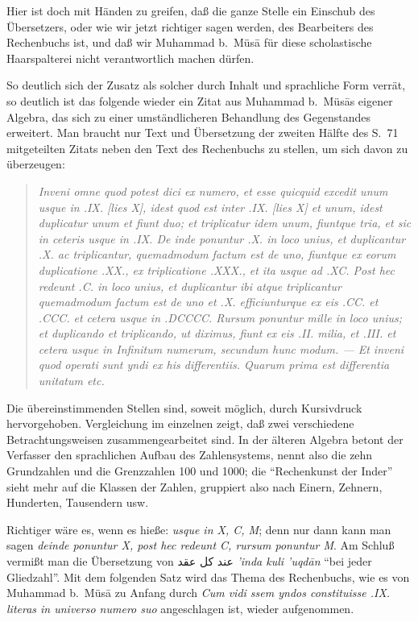 \documentclass[11pt,a4paper]{article}
\newcommand{\RL}[1]{\beginR#1\endR}
\newcommand{\ar}[1]{{\arabicfont\RL{#1}}}
\newcommand{\enquote}[1]{``#1''}
\begin{document}
Hier ist doch mit H\"anden zu greifen, da\ss{} die ganze Stelle ein Einschub des \"Ubersetzers, oder wie wir jetzt richtiger sagen werden, des Bearbeiters des Rechenbuchs ist, und da\ss{} wir Muhammad b.\ M\"us\=a f\"ur diese scholastische Haarspalterei nicht verantwortlich machen d\"urfen.

So deutlich sich der Zusatz als solcher durch Inhalt und sprachliche Form verr\"at, so deutlich ist das folgende wieder ein Zitat aus Muhammad b.\ M\"us\=as eigener Algebra, das sich zu einer umst\"andlicheren Behandlung des Gegenstandes erweitert. Man braucht nur Text und \"Ubersetzung der zweiten H\"alfte des S.\ 71 mitgeteilten Zitats neben den Text des Rechenbuchs zu stellen, um sich davon zu \"uberzeugen:

\begin{quote}
\textit{Inveni omne quod potest dici ex numero, et esse quicquid excedit unum usque in .IX. [lies X], idest quod est inter .IX. [lies X] et unum, idest duplicatur unum et fiunt duo; et triplicatur idem unum, fiuntque tria, et sic in ceteris usque in .IX. De inde ponuntur .X. in loco unius, et duplicantur .X. ac triplicantur, quemadmodum factum est de uno, fiuntque ex eorum duplicatione .XX., ex triplicatione .XXX., et ita usque ad .XC. Post hec redeunt .C. in loco unius, et duplicantur ibi atque triplicantur quemadmodum factum est de uno et .X. efficiunturque ex eis .CC. et .CCC. et cetera usque in .DCCCC. Rursum ponuntur mille in loco unius; et duplicando et triplicando, ut diximus, fiunt ex eis .II. milia, et .III. et cetera usque in Infinitum numerum, secundum hunc modum. --- Et inveni quod operati sunt yndi ex his differentiis. Quarum prima est differentia unitatum etc.}
\end{quote}

Die \"ubereinstimmenden Stellen sind, soweit m\"oglich, durch Kursivdruck hervorgehoben. Vergleichung im einzelnen zeigt, da\ss{} zwei verschiedene Betrachtungsweisen zusammengearbeitet sind. In der \"alteren Algebra betont der Verfasser den sprachlichen Aufbau des Zahlensystems, nennt also die zehn Grundzahlen und die Grenzzahlen 100 und 1000; die \enquote{Rechenkunst der Inder} sieht mehr auf die Klassen der Zahlen, gruppiert also nach Einern, Zehnern, Hunderten, Tausendern usw.

Richtiger w\"are es, wenn es hie\ss{}e: \textit{usque in X, C, M}; denn nur dann kann man sagen \textit{deinde ponuntur X, post hec redeunt C, rursum ponuntur M}. Am Schlu\ss{} vermi\ss{}t man die \"Ubersetzung von \ar{عند كل عقد} \textit{'inda kuli 'uqd\=an} \enquote{bei jeder Gliedzahl}. Mit dem folgenden Satz wird das Thema des Rechenbuchs, wie es von Muhammad b.\ M\"us\=a zu Anfang durch \textit{Cum vidi ssem yndos constituisse .IX. literas in universo numero suo} angeschlagen ist, wieder aufgenommen.
\end{document}
